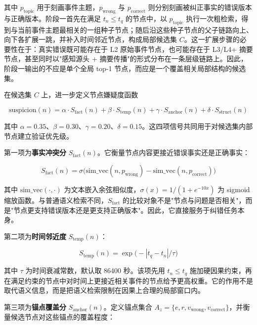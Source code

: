 其中 $p_{\mathrm{topic}}$ 用于刻画事件主题，$p_{\mathrm{wrong}}$ 与 $p_{\mathrm{correct}}$ 则分别刻画被纠正事实的错误版本与正确版本。阶段一首先在满足 $t_n \le t_q$ 的节点中，以 $p_{\mathrm{topic}}$ 执行一次粗检索，得到与当前事件主题最相关的一组种子节点；随后沿这些种子节点的父子链路向上、向下各扩展一跳，并补入时间邻近节点，构成局部候选集 $C$。这一扩展步骤的必要性在于：真实错误既可能存在于 L2 原始事件节点，也可能存在于 L3/L4+ 摘要节点，甚至同时以"感知源头 + 摘要传播"的形式分布在一条层级链路上。因此，阶段一输出的不应是单个全局 top-1 节点，而应是一个覆盖相关局部结构的候选集。

在候选集 $C$ 上，进一步定义节点嫌疑度函数

\begin{equation}
\mathrm{suspicion}(n) = \alpha \cdot S_{\mathrm{fact}}(n) + \beta \cdot S_{\mathrm{temp}}(n) + \gamma \cdot S_{\mathrm{anchor}}(n) + \delta \cdot S_{\mathrm{struct}}(n)
\label{eq:5-5}
\end{equation}

其中 $\alpha=0.35$、$\beta=0.30$、$\gamma=0.20$、$\delta=0.15$。这四项信号共同用于对候选集内部节点建立验证优先级。

第一项为\textbf{事实冲突分} $S_{\mathrm{fact}}(n)$。它衡量节点内容更接近错误事实还是正确事实：

\begin{equation}
S_{\mathrm{fact}}(n) = \sigma\big( \mathrm{sim\_vec}(n, p_{\mathrm{wrong}}) - \mathrm{sim\_vec}(n, p_{\mathrm{correct}}) \big)
\label{eq:5-6}
\end{equation}

其中 $\mathrm{sim\_vec}(\cdot,\cdot)$ 为文本嵌入余弦相似度，$\sigma(x)=1/(1+e^{-10x})$ 为 sigmoid 缩放函数。与普通语义检索不同，$S_{\mathrm{fact}}$ 的比较对象不是"节点与问题是否相关"，而是"节点更支持错误版本还是更支持正确版本"。因此，它直接服务于纠错任务本身。

第二项为\textbf{时间邻近度} $S_{\mathrm{temp}}(n)$：

\begin{equation}
S_{\mathrm{temp}}(n) = \exp\big( -|t_q - t_n| / \tau \big)
\label{eq:5-7}
\end{equation}

其中 $\tau$ 为时间衰减常数，默认取 86400 秒。该项先用 $t_n \le t_q$ 施加硬因果约束，再在满足约束的节点中对时间上更接近相关事件的节点给予更高权重。它的作用不是取代语义信息，而是把语义检索限制在因果上合理的局部窗口内。

第三项为\textbf{锚点覆盖分} $S_{\mathrm{anchor}}(n)$。定义锚点集合 $A_z=\{e,r,v_{\mathrm{wrong}},v_{\mathrm{correct}}\}$，并衡量候选节点对这些锚点的覆盖程度：

